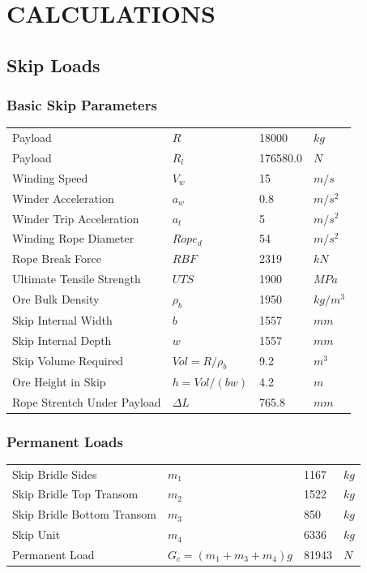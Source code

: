 \documentclass{article}%
\begin{document}
%
\newpage

%
\section{CALCULATIONS}%
\label{sec:CALCULATIONS}%
\subsection{Skip Loads}%
\label{subsec:SkipLoads}%
\subsubsection{Basic Skip Parameters}%
\label{ssubsec:BasicSkipParameters}%
\begin{flushleft}%
\begin{minipage}{\textwidth}%
\flushleft%
\begin{tabular}{l l l l}%
Payload&$R$&18000&$kg$\\%
Payload&$R_l$&176580.0&$N$\\%
Winding Speed&$V_w$&15&$m/s$\\%
Winder Acceleration&$a_w$&0.8&$m/s^2$\\%
Winder Trip Acceleration&$a_t$&5&$m/s^2$\\%
Winding Rope Diameter&$Rope_d$&54&$m/s^2$\\%
Rope Break Force&$RBF$&2319&$kN$\\%
Ultimate Tensile Strength&$UTS$&1900&$MPa$\\%
Ore Bulk Density&$\rho_b$&1950&$kg/m^3$\\%
Skip Internal Width&$b$&1557&$mm$\\%
Skip Internal Depth&$w$&1557&$mm$\\%
Skip Volume Required&$Vol = R / \rho_b$&9.2&$m^3$\\%
Ore Height in Skip&$h = Vol/(b w)$&4.2&$m$\\%
Rope Strentch Under Payload&$\Delta L$&765.8&$mm$\\%
\end{tabular}%
\end{minipage}%
\end{flushleft}

%
\subsubsection{Permanent Loads}%
\label{ssubsec:PermanentLoads}%
\begin{flushleft}%
\begin{minipage}{\textwidth}%
\flushleft%
\begin{tabular}{l l l l}%
Skip Bridle Sides&$m_1$&1167&$kg$\\%
Skip Bridle Top Transom&$m_2$&1522&$kg$\\%
Skip Bridle Bottom Transom&$m_3$&850&$kg$\\%
Skip Unit&$m_4$&6336&$kg$\\%
Permanent Load&$G_c = (m_1 + m_3 + m_4)g$&81943&$N$\\%
\end{tabular}%
\end{minipage}%
\end{flushleft}%
\end{document}
